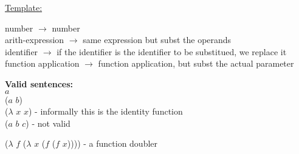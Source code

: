 \documentclass{article}
\begin{document}
\begin{flushleft}
\underline{Template:}\\
\end{flushleft}
\begin{flushleft}
number $\rightarrow$ number\\
arith-expression $\rightarrow$ same expression but subst the operands\\
identifier $\rightarrow$ if the identifier is the identifier to be substitued, we replace it\\
function application $\rightarrow$ function application, but subst the actual parameter\\
\end{flushleft}
\textbf{Valid sentences:}\\
$\mathit{a}$\\
($\mathit{a}$ $\mathit{b}$)\\
($\lambda$ $\mathit{x}$ $\mathit{x}$) - informally this is the identity function\\
{($\mathit{a}$ $\mathit{b}$ $\mathit{c}$)} - {not valid}

($\lambda$ $\mathit{f}$ ($\lambda$ $\mathit{x}$ ($\mathit{f}$ 
($\mathit{f}$ $\mathit{x}$)))) - a function doubler\\
\end{document}
